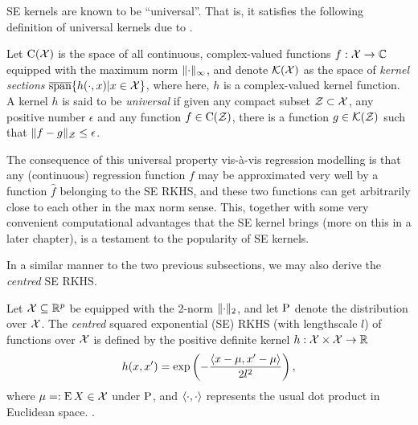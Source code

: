 
SE kernels are known to be ``universal''. That is, it satisfies the following definition of universal kernels due to \citet{micchelli2006universal}.

\begin{definition}
  Let $\text{C}({\mathcal X})$ is the space of all continuous, complex-valued functions $f:{\mathcal X}\to\mathbb{C}$ equipped with the maximum norm $\lVert\cdot\rVert_\infty$, and denote ${\mathcal K}({\mathcal X})$ as the space of \emph{kernel sections} $ \overline{\text{span}}\{ h(\cdot,x) | x \in {\mathcal X} \}$, where here, $h$ is a complex-valued kernel function.
  A kernel $h$ is said to be \emph{universal} if given any compact subset ${\mathcal Z} \subset {\mathcal X}$, any positive number $\epsilon$ and any function $f \in \text{C}({\mathcal Z})$, there is a function $g \in {\mathcal K}({\mathcal Z})$ such that $\lVert f-g\rVert_{\mathcal Z} \leq \epsilon$.
\end{definition}

The consequence of this universal property vis-à-vis regression modelling is that any (continuous) regression function $f$ may be approximated very well by a function $\hat f$ belonging to the SE RKHS, and these two functions can get arbitrarily close to each other in the max norm sense.
This, together with some very convenient computational advantages that the SE kernel brings (more on this in a later chapter), is a testament to the popularity of SE kernels.

In a similar manner to the two previous subsections, we may also derive the \emph{centred} SE RKHS. 

\begin{definition}
  Let ${\mathcal X} \subseteq \mathbb{R}^p$ be equipped with the 2-norm $\lVert\cdot\rVert_2$, and let $\operatorname{P}$ denote the distribution over ${\mathcal X}$.
  The \emph{centred} squared exponential (SE) RKHS (with lengthscale $l$) of functions over ${\mathcal X}$ is defined by the positive definite kernel $h:{\mathcal X}\times{\mathcal X}\to\mathbb{R}$ 
  \[
    h(x,x') = \exp\left(-\frac{\langle x-\mu,x'-\mu\rangle}{2l^2} \right),
  \]
  where $\mu =: \operatorname{E} X \in{\mathcal X} $ under $\operatorname{P}$, and $\langle\cdot,\cdot\rangle$ represents the usual dot product in Euclidean space.
  .
\end{definition}


